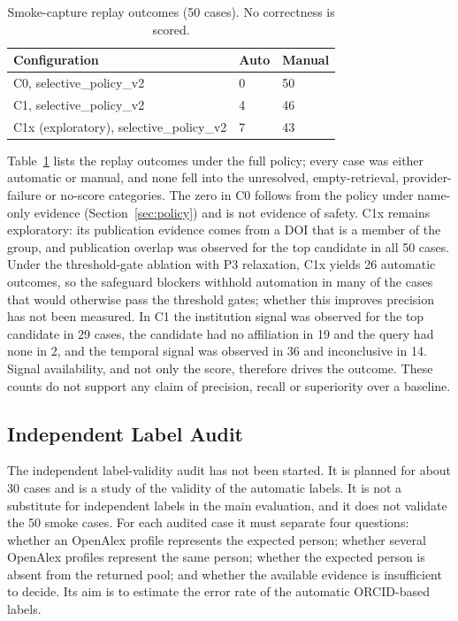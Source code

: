 \begin{table}[t]
\caption{Smoke-capture replay outcomes (50 cases). No correctness is scored.}
\label{tab:smoke-replay}
\centering
\footnotesize
\renewcommand{\arraystretch}{1.1}
\begin{tabular}{@{}p{}p{}p{}@{}}
\toprule
\textbf{Configuration} & \textbf{Auto} & \textbf{Manual} \\
\midrule
C0, selective\_policy\_v2 & 0 & 50 \\
C1, selective\_policy\_v2 & 4 & 46 \\
C1x (exploratory), selective\_policy\_v2 & 7 & 43 \\
\bottomrule
\end{tabular}
\end{table}

Table~\ref{tab:smoke-replay} lists the replay outcomes under the full policy; every case was either automatic or manual, and none fell into the unresolved, empty-retrieval, provider-failure or no-score categories. The zero in C0 follows from the policy under name-only evidence (Section~\ref{sec:policy}) and is not evidence of safety. C1x remains exploratory: its publication evidence comes from a DOI that is a member of the group, and publication overlap was observed for the top candidate in all 50 cases. Under the threshold-gate ablation with P3 relaxation, C1x yields 26 automatic outcomes, so the safeguard blockers withhold automation in many of the cases that would otherwise pass the threshold gates; whether this improves precision has not been measured. In C1 the institution signal was observed for the top candidate in 29 cases, the candidate had no affiliation in 19 and the query had none in 2, and the temporal signal was observed in 36 and inconclusive in 14. Signal availability, and not only the score, therefore drives the outcome. These counts do not support any claim of precision, recall or superiority over a baseline.

\subsection{Independent Label Audit}
\label{sec:audit}
The independent label-validity audit has not been started. It is planned for about 30 cases and is a study of the validity of the automatic labels. It is not a substitute for independent labels in the main evaluation, and it does not validate the 50 smoke cases. For each audited case it must separate four questions: whether an OpenAlex profile represents the expected person; whether several OpenAlex profiles represent the same person; whether the expected person is absent from the returned pool; and whether the available evidence is insufficient to decide. Its aim is to estimate the error rate of the automatic ORCID-based labels.

